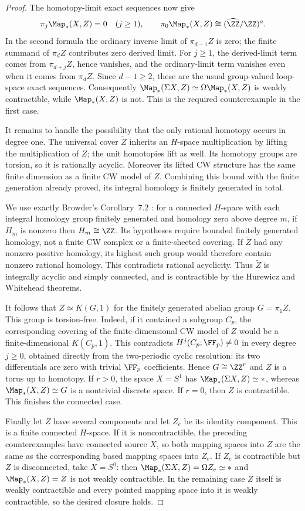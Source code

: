 \begin{proof}
The homotopy-limit exact sequences now give
\[
 \pi_j\Map_*(X,Z)=0\quad(j\geq1),\qquad
 \pi_0\Map_*(X,Z)\cong(\widehat{\ZZ}/\ZZ)^a.
\]
In the second formula the ordinary inverse limit of
$\pi_{d-1}Z$ is zero; the finite summand of $\pi_dZ$ contributes
zero derived limit. For $j\geq1$, the derived-limit term comes
from $\pi_{d+j}Z$, hence vanishes, and the ordinary-limit term
vanishes even when it comes from $\pi_dZ$. Since $d-1\geq2$,
these are the usual group-valued loop-space exact sequences.
Consequently $\Map_*(\Sigma X,Z)\simeq
\Omega\Map_*(X,Z)$ is weakly contractible, while
$\Map_*(X,Z)$ is not. This is the required counterexample in
the first case.

It remains to handle the possibility that the only rational
homotopy occurs in degree one. The universal cover $\widetilde Z$
inherits an $H$-space multiplication by lifting the multiplication
of $Z$; the unit homotopies lift as well. Its homotopy groups are
torsion, so it is rationally acyclic. Moreover its lifted CW
structure has the same finite dimension as a finite CW model of
$Z$. Combining this bound with the finite generation already
proved, its integral homology is finitely generated in total.

We use exactly Browder's Corollary~7.2
\cite[p.~47]{I_Browder1961}: for a connected $H$-space with each
integral homology group finitely generated and homology zero
above degree $m$, if $H_m$ is nonzero then $H_m\cong\ZZ$.
Its hypotheses require bounded finitely generated homology,
not a finite CW complex or a finite-sheeted covering.
If $\widetilde Z$ had any nonzero positive homology, its highest
such group would therefore contain nonzero rational homology.
This contradicts rational acyclicity. Thus $\widetilde Z$ is
integrally acyclic and simply connected, and is contractible by
the Hurewicz and Whitehead theorems.

It follows that $Z\simeq K(G,1)$ for the finitely generated
abelian group $G=\pi_1Z$. This group is torsion-free. Indeed,
if it contained a subgroup $C_p$, the corresponding covering
of the finite-dimensional CW model of $Z$ would be a
finite-dimensional $K(C_p,1)$. This contradicts
$H^j(C_p;\FF_p)\ne0$ in every degree $j\geq0$, obtained directly
from the two-periodic cyclic resolution: its two differentials
are zero with trivial $\FF_p$ coefficients. Hence
$G\cong\ZZ^r$ and $Z$ is a torus up to homotopy.
If $r>0$, the space $X=S^1$ has
$\Map_*(\Sigma X,Z)\simeq *$, whereas
$\Map_*(X,Z)\simeq G$ is a nontrivial discrete space.
If $r=0$, then $Z$ is contractible. This finishes the connected
case.

Finally let $Z$ have several components and let $Z_e$ be its
identity component. This is a finite connected $H$-space.
If it is noncontractible, the preceding counterexamples have
connected source $X$, so both mapping spaces into $Z$ are the
same as the corresponding based mapping spaces into $Z_e$.
If $Z_e$ is contractible but $Z$ is disconnected, take $X=S^0$:
then $\Map_*(\Sigma X,Z)=\Omega Z_e\simeq *$ and
$\Map_*(X,Z)=Z$ is not weakly contractible. In the remaining
case $Z$ itself is weakly contractible and every pointed mapping
space into it is weakly contractible, so the desired closure
holds.
\end{proof}
